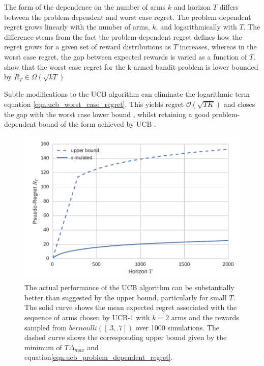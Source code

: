 \documentclass[11pt,a4paper,twoside]{report}
\newcommand{\bigo}[1]{\mathcal{O}\left( #1 \right)}
\newcommand{\bigomega}[1]{\Omega\left( #1 \right)}
\newcommand{\regret}{\bar{R}_{T}} %
\theoremstyle{plain}
\theoremstyle{definition}
\begin{document}
The form of the dependence on the number of arms $k$ and horizon $T$ differs between the problem-dependent and worst case regret. The problem-dependent regret grows linearly with the number of arms, $k$, and logarithmically with $T$. The difference stems from the fact the problem-dependent regret defines how the regret grows for a given set of reward distributions as $T$ increases, whereas in the worst case regret, the gap between expected rewards is varied as a function of $T$. \citet{Auer1995} show that the worst case regret for the k-armed bandit problem is lower bounded by $\regret \in \bigomega{\sqrt{kT}}$

Subtle modifications to the UCB algorithm can eliminate the logarithmic term equation \ref{eqn:ucb_worst_case_regret}. This yields regret $ \bigo{\sqrt{TK}}$ and closes the gap with the worst case lower bound \citep{Audibert2009,Lattimore2015}, whilst retaining a good problem-dependent bound of the form achieved by UCB \citep{Lattimore2015}.

\begin{figure}
\includegraphics[scale=1]{upper_bound_vs_actual_average_regret}
\caption{The actual performance of the UCB algorithm can be substantially better than suggested by the upper bound, particularly for small $T$. The solid curve shows the mean expected regret associated with the sequence of arms chosen by UCB-1 with $k=2$ arms and the rewards sampled from $bernoulli([.3,.7])$ over 1000 simulations. The dashed curve shows the corresponding upper bound given by the minimum of $T\Delta_{max}$ and equation\ref{eqn:ucb_problem_dependent_regret}.}
\label{fig:ucb_upperbound_vs_actual_performance}
\end{figure}
\end{document}
